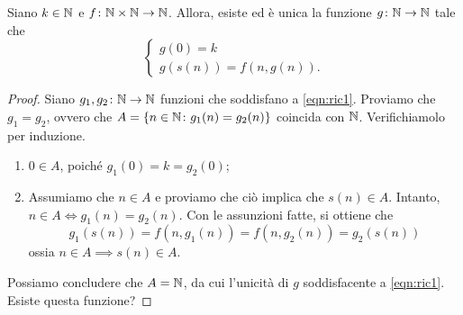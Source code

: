 \begin{thm}
  Siano \(k \in \mathbb{N}\) e \(f \colon \mathbb{N} \times \mathbb{N} \to \mathbb{N}\). Allora, esiste ed è unica la funzione \(g \colon \mathbb{N} \to \mathbb{N}\) tale che
  \begin{equation}
    \begin{cases}
      g(0) = k \\ g(s(n)) = f(n, g(n)).
    \end{cases} \label{eqn:ric1}
  \end{equation}
\end{thm}
\begin{proof}
  Siano \(g_1, g_2 \colon \mathbb{N} \to \mathbb{N}\) funzioni che soddisfano a \eqref{eqn:ric1}. Proviamo che \(g_1 = g_2\), ovvero che \(A = \lbrace n \in \mathbb{N} \colon g_1(n) = g_2(n) \rbrace\) coincida con \(\mathbb{N}\). Verifichiamolo per induzione.
  \begin{enumerate}
    \item \(0 \in A\), poiché \(g_1(0) = k = g_2(0)\);
    \item Assumiamo che \(n \in A\) e proviamo che ciò implica che \(s(n) \in A\). Intanto, \(n \in A \iff g_1(n) = g_2(n)\). Con le assunzioni fatte, si ottiene che
    \[
    g_1(s(n)) = f(n,g_1(n)) = f(n,g_2(n)) = g_2(s(n))
    \]
    ossia \(n \in A \implies s(n) \in A\).
  \end{enumerate}
  Possiamo concludere che \(A = \mathbb{N}\), da cui l'unicità di \(g\) soddisfacente a \eqref{eqn:ric1}. Esiste questa funzione?


\end{proof}
